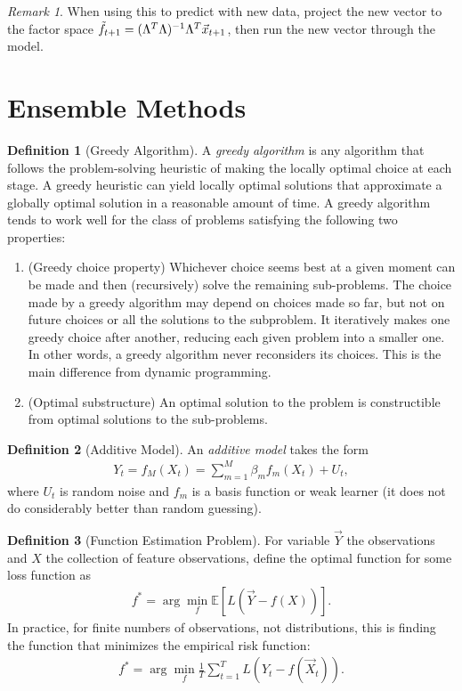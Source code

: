 \documentclass[11pt]{article}
\theoremstyle{definition}
\newtheorem{definition}{Definition}[section]
\theoremstyle{plain}
\theoremstyle{remark}
\newtheorem{remark}{Remark}[section]
\begin{document}
\begin{remark}
    When using this to predict with new data, project the new vector to the factor space $\Tilde{f}_{t+1} = (\Lambda^T\Lambda)^{-1}\Lambda^T\vec{x}_{t+1}$, then run the new vector through the model.
\end{remark}

\section{Ensemble Methods}

\begin{definition}[Greedy Algorithm]
    A \textit{greedy algorithm} is any algorithm that follows the problem-solving heuristic of making the locally optimal choice at each stage. A greedy heuristic can yield locally optimal solutions that approximate a globally optimal solution in a reasonable amount of time. A greedy algorithm tends to work well for the class of problems satisfying the following two properties:
    \begin{enumerate}
        \item (Greedy choice property) Whichever choice seems best at a given moment can be made and then (recursively) solve the remaining sub-problems. The choice made by a greedy algorithm may depend on choices made so far, but not on future choices or all the solutions to the subproblem. It iteratively makes one greedy choice after another, reducing each given problem into a smaller one. In other words, a greedy algorithm never reconsiders its choices. This is the main difference from dynamic programming.
        \item (Optimal substructure) An optimal solution to the problem is constructible from optimal solutions to the sub-problems.
    \end{enumerate}
\end{definition}

\begin{definition}[Additive Model]
    An \textit{additive model} takes the form
    \begin{align}
        Y_t = f_M(X_t)=\sum_{m=1}^M \beta_m f_m(X_t) + U_t,
    \end{align}
    where $U_t$ is random noise and $f_m$ is a basis function or weak learner (it does not do considerably better than random guessing).
\end{definition}

\begin{definition}[Function Estimation Problem]
    For variable $\vec{Y}$ the observations and $X$ the collection of feature observations, define the optimal function for some loss function as
    \begin{align}
        f^* = \arg \min_f \mathbb{E}[L\left(\vec{Y}-f(X)\right)].
    \end{align}
    In practice, for finite numbers of observations, not distributions, this is finding the function that minimizes the empirical risk function:
    \begin{align}
        f^* = \arg \min_f \frac{1}{T} \sum_{t=1}^T L\left(Y_t - f(\vec{X}_t)\right).
    \end{align}
\end{definition}
\end{document}
